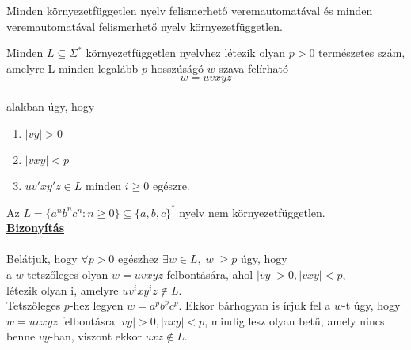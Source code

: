 \begin{frame}
\begin{tcolorbox}[squeezed title={Tétel: Környezetfüggetlen nyelv és veremautomata}]
Minden környezetfüggetlen nyelv felismerhető veremautomatával és minden veremautomatával felismerhető nyelv környezetfüggetlen.
\end{tcolorbox}

\begin{tcolorbox}[title={Tétel: Pumpáló lemma környezetfüggetlen nyelvre}]
Minden $L \subseteq {\Sigma}^*$ környezetfüggetlen nyelvhez létezik olyan $p > 0$ természetes szám, amelyre L minden legalább $p$ hosszúságó $w$ szava felírható $$w = uvxyz$$\\
alakban úgy, hogy\\
\begin{enumerate}
\item $|vy| > 0$
\item $|vxy| < p$
\item $uv'xy'z \in L$ minden $i \geq 0$ egészre.
\end{enumerate}

\end{tcolorbox}
\end{frame}

\begin{frame}
\begin{tcolorbox}[title={Tétel: Példa nem környezetfüggetlen nyelvre 1}]
Az $L = \{a^nb^nc^n : n \geq 0 \} \subseteq \{a, b, c\}^*$ nyelv nem környezetfüggetlen.\\
\tcblower
\msmallskip
\underline{\textbf{Bizonyítás}}\\
\mmedskip
\\
Belátjuk, hogy ${\forall}p > 0$ egészhez ${\exists}w \in L, |w| \geq p$ úgy, hogy\\
a $w$ tetszőleges olyan $w = uvxyz$ felbontására, ahol $|vy| > 0, |vxy| < p$,\\
létezik olyan i, amelyre $uv^ixy^iz \notin L$.\\
\mbigskip
Tetszőleges $p$-hez legyen $w = a^pb^pc^p$. Ekkor bárhogyan is írjuk fel a $w$-t úgy, hogy $w = uvxyz$ felbontásra $|vy| > 0, |vxy| < p$, mindíg lesz olyan betű, amely nincs benne $vy$-ban, viszont ekkor $uxz \notin L$.
\end{tcolorbox}
\end{frame}

